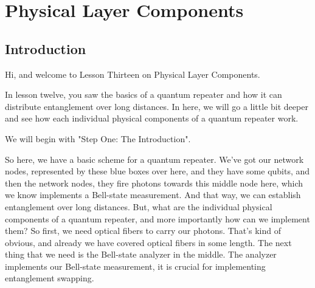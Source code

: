 
\chapter{Physical Layer Components}

\section{Introduction}

Hi, and welcome to Lesson Thirteen on Physical Layer Components.

In lesson twelve, you saw the basics of a quantum repeater and how it can distribute entanglement over long distances. In here, we will go a little bit deeper and see how each individual physical components of a quantum repeater work.

We will begin with "Step One: The Introduction".

So here, we have a basic scheme for a quantum repeater. We've got our network nodes, represented by these blue boxes over here, and they have some qubits, and then the network nodes, they fire photons towards this middle node here, which we know implements a Bell-state measurement. And that way, we can establish entanglement over long distances. But, what are the individual physical components of a quantum repeater, and more importantly how can we implement them? So first, we need optical fibers to carry our photons. That's kind of obvious, and already we have covered optical fibers in some length. The next thing that we need is the Bell-state analyzer in the middle. The analyzer implements our Bell-state measurement, it is crucial for implementing entanglement swapping.

